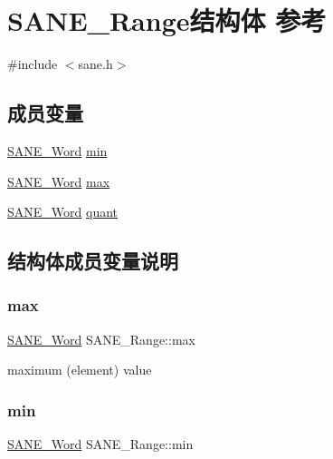 \hypertarget{structSANE__Range}{}\section{S\+A\+N\+E\+\_\+\+Range结构体 参考}
\label{structSANE__Range}


{\ttfamily \#include $<$sane.\+h$>$}

\subsection*{成员变量}
\begin{DoxyCompactItemize}
\item 
\hyperlink{sane_8h_aa65d63e57d37984b9d873811a7544b4a}{S\+A\+N\+E\+\_\+\+Word} \hyperlink{structSANE__Range_a97de9e26d86aba290906af55bc9a716a}{min}
\item 
\hyperlink{sane_8h_aa65d63e57d37984b9d873811a7544b4a}{S\+A\+N\+E\+\_\+\+Word} \hyperlink{structSANE__Range_abbf732668d90812e9a3f4a5983249657}{max}
\item 
\hyperlink{sane_8h_aa65d63e57d37984b9d873811a7544b4a}{S\+A\+N\+E\+\_\+\+Word} \hyperlink{structSANE__Range_a88ea83dce447e4edfc7dc60867d038e4}{quant}
\end{DoxyCompactItemize}


\subsection{结构体成员变量说明}
\mbox{\label{structSANE__Range_abbf732668d90812e9a3f4a5983249657}} 
\subsubsection{\texorpdfstring{max}{max}}
{\footnotesize\ttfamily \hyperlink{sane_8h_aa65d63e57d37984b9d873811a7544b4a}{S\+A\+N\+E\+\_\+\+Word} S\+A\+N\+E\+\_\+\+Range\+::max}

maximum (element) value \mbox{\label{structSANE__Range_a97de9e26d86aba290906af55bc9a716a}} 
\subsubsection{\texorpdfstring{min}{min}}
{\footnotesize\ttfamily \hyperlink{sane_8h_aa65d63e57d37984b9d873811a7544b4a}{S\+A\+N\+E\+\_\+\+Word} S\+A\+N\+E\+\_\+\+Range\+::min}

